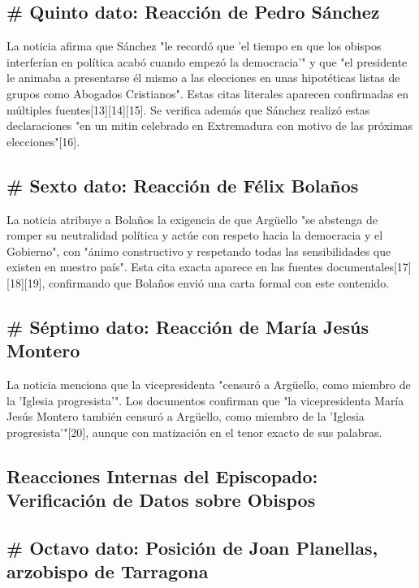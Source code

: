 \documentclass[10pt,a4paper]{article}
\begin{document}
\subsection*{\# Quinto dato: Reacci\'{o}n de Pedro S\'{a}nchez}

 La noticia afirma que S\'{a}nchez "le record\'{o} que 'el tiempo en que los obispos interfer\'{i}an en pol\'{i}tica acab\'{o} cuando empez\'{o} la democracia'" y que "el presidente le animaba a presentarse \'{e}l mismo a las elecciones en unas hipot\'{e}ticas listas de grupos como Abogados Cristianos". Estas citas literales aparecen confirmadas en m\'{u}ltiples fuentes[13][14][15]. Se verifica adem\'{a}s que S\'{a}nchez realiz\'{o} estas declaraciones "en un mitin celebrado en Extremadura con motivo de las pr\'{o}ximas elecciones"[16]. 

\subsection*{\# Sexto dato: Reacci\'{o}n de F\'{e}lix Bola\~{n}os}

 La noticia atribuye a Bola\~{n}os la exigencia de que Arg\"{u}ello "se abstenga de romper su neutralidad pol\'{i}tica y act\'{u}e con respeto hacia la democracia y el Gobierno", con "\'{a}nimo constructivo y respetando todas las sensibilidades que existen en nuestro pa\'{i}s". Esta cita exacta aparece en las fuentes documentales[17][18][19], confirmando que Bola\~{n}os envi\'{o} una carta formal con este contenido. 

\subsection*{\# S\'{e}ptimo dato: Reacci\'{o}n de Mar\'{i}a Jes\'{u}s Montero}

 La noticia menciona que la vicepresidenta "censur\'{o} a Arg\"{u}ello, como miembro de la 'Iglesia progresista'". Los documentos confirman que "la vicepresidenta Mar\'{i}a Jes\'{u}s Montero tambi\'{e}n censur\'{o} a Arg\"{u}ello, como miembro de la 'Iglesia progresista'"[20], aunque con matizaci\'{o}n en el tenor exacto de sus palabras. 

\subsection*{Reacciones Internas del Episcopado: Verificaci\'{o}n de Datos sobre Obispos}



\subsection*{\# Octavo dato: Posici\'{o}n de Joan Planellas, arzobispo de Tarragona}
\end{document}
